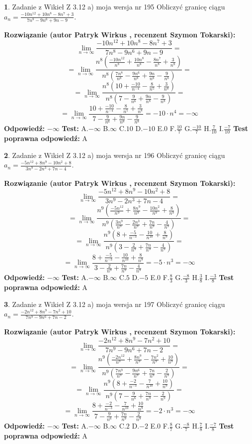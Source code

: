 \documentclass[12pt, a4paper]{article}
\theoremstyle{definition} %
\newtheorem{zad}{}
\newcommand{\zadStart}[1]{\begin{zad}#1\newline}
\newcommand{\zadStop}{\end{zad}}
\newcommand{\rozwStart}[2]{\noindent \textbf{Rozwiązanie (autor #1 , recenzent #2): }\newline}
\newcommand{\rozwStop}{\newline}
\newcommand{\odpStart}{\noindent \textbf{Odpowiedź:}\newline}
\newcommand{\odpStop}{\newline}
\newcommand{\testStart}{\noindent \textbf{Test:}\newline}
\newcommand{\testStop}{\newline}
\newcommand{\kluczStart}{\noindent \textbf{Test poprawna odpowiedź:}\newline}
\newcommand{\kluczStop}{\newline}
\begin{document}
\zadStart{Zadanie z Wikieł Z 3.12 a) moja wersja nr 195}
Obliczyć granicę ciągu $a_{n}=\frac{-10n^{12}+10n^{8}-8n^{7}+3}{7n^{8}-9n^{6}+9n-9}$.
\zadStop
\rozwStart{Patryk Wirkus}{Szymon Tokarski}
$$\lim\limits_{n\to\infty}\frac{-10n^{12}+10n^{8}-8n^{7}+3}{7n^{8}-9n^{6}+9n-9}=$$
$$=\lim\limits_{n\to\infty}\frac{n^{8}\left(\frac{-10n^{12}}{n^{8}}+\frac{10n^{8}}{n^{8}}-\frac{8n^{7}}{n^{8}}+\frac{3}{n^{8}}\right)}{n^{8}\left(\frac{7n^{8}}{n^{8}}-\frac{9n^{6}}{n^{8}}+\frac{9n}{n^{8}}-\frac{9}{n^{8}}\right)}=$$
$$=\lim\limits_{n\to\infty}\frac{n^{8}\left(10+\frac{-10}{n^{-4}}-\frac{8}{n^{5}}+\frac{3}{n^{8}}\right)}
{n^{8}\left(7-\frac{9}{n^{6}}+\frac{9n}{n^{8}}-\frac{9}{n^{8}}\right)}=$$
$$=\lim\limits_{n\to\infty}\frac{10+\frac{-10}{n^{-4}}-\frac{8}{n^{5}}+\frac{3}{n^{8}}}{7-\frac{9}{n^{6}}+\frac{9n}{n^{8}}-\frac{9}{n^{8}}}=-10\cdot n^{4} = -\infty$$
\rozwStop
\odpStart
$-\infty$
\odpStop
\testStart
A.$-\infty$
B.$\infty$
C.$10$
D.$-10$
E.$0$
F.$\frac{10}{7}$
G.$\frac{-10}{7}$
H.$\frac{7}{10}$
I.$\frac{-7}{10}$
\testStop
\kluczStart
A
\kluczStop



\zadStart{Zadanie z Wikieł Z 3.12 a) moja wersja nr 196}
Obliczyć granicę ciągu $a_{n}=\frac{-5n^{12}+8n^{9}-10n^{2}+8}{3n^{9}-2n^{3}+7n-4}$.
\zadStop
\rozwStart{Patryk Wirkus}{Szymon Tokarski}
$$\lim\limits_{n\to\infty}\frac{-5n^{12}+8n^{9}-10n^{2}+8}{3n^{9}-2n^{3}+7n-4}=$$
$$=\lim\limits_{n\to\infty}\frac{n^{9}\left(\frac{-5n^{12}}{n^{9}}+\frac{8n^{9}}{n^{9}}-\frac{10n^{2}}{n^{9}}+\frac{8}{n^{9}}\right)}{n^{9}\left(\frac{3n^{9}}{n^{9}}-\frac{2n^{3}}{n^{9}}+\frac{7n}{n^{9}}-\frac{4}{n^{9}}\right)}=$$
$$=\lim\limits_{n\to\infty}\frac{n^{9}\left(8+\frac{-5}{n^{-3}}-\frac{10}{n^{10}}+\frac{8}{n^{9}}\right)}
{n^{9}\left(3-\frac{2}{n^{9}}+\frac{7n}{n^{9}}-\frac{4}{n^{9}}\right)}=$$
$$=\lim\limits_{n\to\infty}\frac{8+\frac{-5}{n^{-3}}-\frac{10}{n^{10}}+\frac{8}{n^{9}}}{3-\frac{2}{n^{9}}+\frac{7n}{n^{9}}-\frac{4}{n^{9}}}=-5\cdot n^{3} = -\infty$$
\rozwStop
\odpStart
$-\infty$
\odpStop
\testStart
A.$-\infty$
B.$\infty$
C.$5$
D.$-5$
E.$0$
F.$\frac{8}{3}$
G.$\frac{-8}{3}$
H.$\frac{3}{8}$
I.$\frac{-3}{8}$
\testStop
\kluczStart
A
\kluczStop



\zadStart{Zadanie z Wikieł Z 3.12 a) moja wersja nr 197}
Obliczyć granicę ciągu $a_{n}=\frac{-2n^{12}+8n^{9}-7n^{2}+10}{7n^{9}-9n^{6}+7n-2}$.
\zadStop
\rozwStart{Patryk Wirkus}{Szymon Tokarski}
$$\lim\limits_{n\to\infty}\frac{-2n^{12}+8n^{9}-7n^{2}+10}{7n^{9}-9n^{6}+7n-2}=$$
$$=\lim\limits_{n\to\infty}\frac{n^{9}\left(\frac{-2n^{12}}{n^{9}}+\frac{8n^{9}}{n^{9}}-\frac{7n^{2}}{n^{9}}+\frac{10}{n^{9}}\right)}{n^{9}\left(\frac{7n^{9}}{n^{9}}-\frac{9n^{6}}{n^{9}}+\frac{7n}{n^{9}}-\frac{2}{n^{9}}\right)}=$$
$$=\lim\limits_{n\to\infty}\frac{n^{9}\left(8+\frac{-2}{n^{-3}}-\frac{7}{n^{10}}+\frac{10}{n^{9}}\right)}
{n^{9}\left(7-\frac{9}{n^{6}}+\frac{7n}{n^{9}}-\frac{2}{n^{9}}\right)}=$$
$$=\lim\limits_{n\to\infty}\frac{8+\frac{-2}{n^{-3}}-\frac{7}{n^{10}}+\frac{10}{n^{9}}}{7-\frac{9}{n^{6}}+\frac{7n}{n^{9}}-\frac{2}{n^{9}}}=-2\cdot n^{3} = -\infty$$
\rozwStop
\odpStart
$-\infty$
\odpStop
\testStart
A.$-\infty$
B.$\infty$
C.$2$
D.$-2$
E.$0$
F.$\frac{8}{7}$
G.$\frac{-8}{7}$
H.$\frac{7}{8}$
I.$\frac{-7}{8}$
\testStop
\kluczStart
A
\kluczStop
\end{document}
